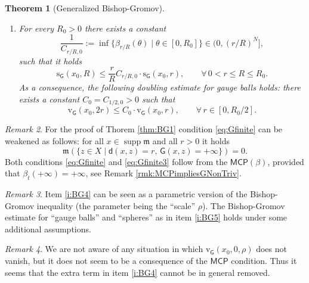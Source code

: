 \documentclass[11pt,a4paper]{article}
\theoremstyle{plain}
\newtheorem{theorem}{Theorem}[section]
\theoremstyle{definition}
\theoremstyle{remark}
\newtheorem{remark}[theorem]{Remark}
\numberwithin{equation}{section}
\DeclareMathOperator{\supp}{\mathrm{supp}}
\newcommand{\MCP}{\mathsf{MCP}}
\newcommand{\rv}{\mathrm{v}}
\newcommand{\rs}{\mathrm{s}}
\newcommand{\mm}{\mathfrak m}
\newcommand{\sfd}{\mathsf d}
\newcommand{\sfG}{\mathsf G}
\begin{document}
\begin{theorem}[Generalized Bishop-Gromov]
\begin{enumerate}[label = (\roman*)]
\begin{equation}
\end{equation}
are monotone non-increasing.
\item  \label{i:BG6} For every $R_0>0$ there exists a constant
\begin{equation}
\frac{1}{C_{r/R,0}}:=\inf\{\beta_{r/R}(\theta)\mid \theta \in [0,R_0]\} \in (0,(r/R)^N],
\end{equation}
such that it holds
\begin{equation}
 \rs_{\sfG}(x_0,R) \leq \frac{r}{R} C_{r/R,0}\cdot \rs_{\sfG}(x_0,r), \qquad \forall\, 0<r\leq R \leq R_0.
\end{equation}
As a consequence, the following doubling estimate for gauge balls holds: there exists a constant $C_0 = C_{1/2,0}>0$ such that
\begin{equation}
\rv_{\sfG}(x_0,2r)\leq C_0 \cdot \rv_{\sfG}(x_0,r), \qquad \forall\, r \in [0,R_0/2].
\end{equation}
\end{enumerate}
\end{theorem}

\begin{remark}\label{rem:onCond3.15}
For the proof of Thorem \ref{thm:BG1} condition \eqref{eq:Gfinite} can be weakened as follows: for all $x\in\supp\mm$  and all $r>0$ it holds
\begin{equation}\label{eq:Gfinite3}
\mm(\{z\in X\mid   \sfd(x,z)=r,\, \sfG(x, z)=+\infty\})=0.
\end{equation}
Both conditions \eqref{eq:Gfinite} and  \eqref{eq:Gfinite3} follow from the $\MCP(\beta)$, provided that $\beta_t(+\infty) = +\infty$, see Remark \ref{rmk:MCPimpliesGNonTriv}.
\end{remark}
\begin{remark}
Item \ref{i:BG4} can be seen as a parametric version of the Bishop-Gromov inequality (the parameter being the ``scale'' $\rho$). The Bishop-Gromov estimate for ``gauge balls'' and ``spheres'' as in item \ref{i:BG5} holds under some additional assumptions.
\end{remark}
\begin{remark}
We are not aware of any situation in which $\rv_{\sfG}(x_0,0,\rho)$ does not vanish, but it does not seem to be a consequence of the $\MCP$ condition. Thus it seems that the extra term in item \ref{i:BG4} cannot be in general removed.
\end{remark}
\end{document}
